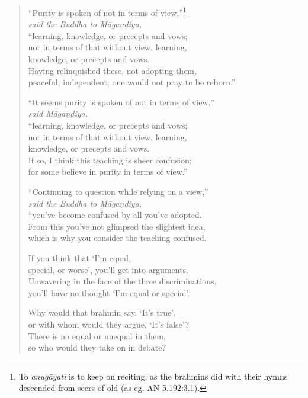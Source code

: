 \documentclass[12pt,openany]{book}%
\newcommand*{\scspeaker}[1]{\hspace{2em}\textit{#1}}
\begin{document}
\begin{verse}
“Purity is spoken of not in terms of view,”\footnote{To \textit{\textsanskrit{anugāyati}} is to keep on reciting, as the brahmins did with their hymns descended from seers of old (as eg. AN 5.192:3.1). } \\
\scspeaker{said the Buddha to \textsanskrit{Māgaṇḍiya}, }\\
“learning, knowledge, or precepts and vows; \\
nor in terms of that without view, learning, \\
knowledge, or precepts and vows. \\
Having relinquished these, not adopting them, \\
peaceful, independent, one would not pray to be reborn.” 

“It seems purity is spoken of not in terms of view,” \\
\scspeaker{said \textsanskrit{Māgaṇḍiya}, }\\
“learning, knowledge, or precepts and vows; \\
nor in terms of that without view, learning, \\
knowledge, or precepts and vows. \\
If so, I think this teaching is sheer confusion; \\
for some believe in purity in terms of view.” 

“Continuing to question while relying on a view,” \\
\scspeaker{said the Buddha to \textsanskrit{Māgaṇḍiya}, }\\
“you’ve become confused by all you’ve adopted. \\
From this you’ve not glimpsed the slightest idea, \\
which is why you consider the teaching confused. 

If you think that ‘I’m equal, \\
special, or worse’, you’ll get into arguments. \\
Unwavering in the face of the three discriminations, \\
you’ll have no thought ‘I’m equal or special’. 

Why would that brahmin say, ‘It’s true’, \\
or with whom would they argue, ‘It’s false’? \\
There is no equal or unequal in them, \\
so who would they take on in debate? 


\end{verse}
\end{document}
